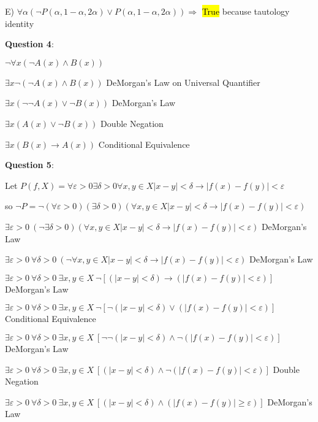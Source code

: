 \documentclass{article} %
\newcommand{\question}[2][]{\begin{flushleft}
        \textbf{Question #1}: \textit{#2}

\end{flushleft}}
\begin{document}
    E) $\forall \alpha (\neg P(\alpha, 1 - \alpha, 2 \alpha) \lor P(\alpha, 1-\alpha, 2\alpha)) \Rightarrow$ \hl{True} because tautology identity

    \question[4]{}

    $\neg \forall x (\neg A(x) \land B(x))$

    $\exists x \neg(\neg A(x) \land B(x))$ \tabto*{5cm} DeMorgan's Law on Universal Quantifier

    $\exists x (\neg \neg A(x) \lor \neg B(x))$ \tabto*{5cm} DeMorgan's Law

    $\exists x (A(x) \lor \neg B(x))$ \tabto*{5cm} Double Negation

    $\exists x (B(x) \rightarrow A(x))$ \tabto*{5cm} Conditional Equivalence

    \newpage

    \question[5]{}

    Let $P(f, X) = \forall \varepsilon > 0 \exists \delta > 0 \forall x, y \in X |x - y| < \delta \rightarrow |f(x) - f(y)| < \varepsilon$

    so $\neg P = \neg (\forall \varepsilon > 0) (\exists \delta > 0) (\forall x, y \in X |x - y| < \delta \rightarrow |f(x) - f(y)| < \varepsilon)$

    $\exists \varepsilon > 0\ (\neg \exists \delta > 0) (\forall x, y \in X |x - y| < \delta \rightarrow |f(x) - f(y)| < \varepsilon)$ \tabto*{11cm} DeMorgan's Law
    
    $\exists \varepsilon > 0\ \forall \delta > 0\ (\neg \forall x, y \in X |x - y| < \delta \rightarrow |f(x) - f(y)| < \varepsilon)$ \tabto*{11cm} DeMorgan's Law
    
    $\exists \varepsilon > 0\ \forall \delta > 0\ \exists x, y \in X\ \neg [(|x - y| < \delta) \rightarrow (|f(x) - f(y)| < \varepsilon)]$ \tabto*{11cm} DeMorgan's Law
    
    $\exists \varepsilon > 0\ \forall \delta > 0\ \exists x, y \in X\ \neg [\neg (|x - y| < \delta) \lor (|f(x) - f(y)| < \varepsilon)]$ \tabto*{11cm} Conditional Equivalence
    
    $\exists \varepsilon > 0\ \forall \delta > 0\ \exists x, y \in X\ [\neg \neg (|x - y| < \delta) \land  \neg (|f(x) - f(y)| < \varepsilon)]$ \tabto*{11cm} DeMorgan's Law

    $\exists \varepsilon > 0\ \forall \delta > 0\ \exists x, y \in X\ [ (|x - y| < \delta) \land \neg (|f(x) - f(y)| < \varepsilon)]$ \tabto*{11cm} Double Negation

    $\exists \varepsilon > 0\ \forall \delta > 0\ \exists x, y \in X\ [(|x - y| < \delta) \land (|f(x) - f(y)| \geq \varepsilon)]$ \tabto*{11cm} DeMorgan's Law
\end{document}
